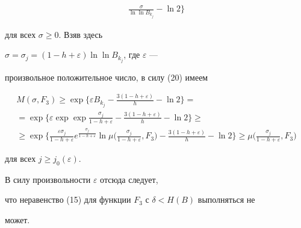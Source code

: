 \begin{pf}
\begin{multline*}
\frac{\sigma}{\ln\ln B_{k_j}}-\ln 2\biggr\} 


\end{multline*} 


для всех $\sigma\ge 0$. Взяв здесь 


$\sigma=\sigma_j=(1-h+\varepsilon)\ln\ln B_{k_j}$, где $\varepsilon$ --- 


произвольное положительное число, в силу (20) имеем 


\begin{multline*} 


M(\sigma,F_3)\ge \exp\biggl\{\varepsilon B_{k_j}- 


\frac{3(1-h+\varepsilon)}{h}-\ln 2\biggr\}=\\ 


=\exp\biggl\{\varepsilon\exp\exp\frac{\sigma_j}{1-h+\varepsilon} 


-\frac{3(1-h+\varepsilon)}{h}-\ln 2\biggr\}\ge\\ 


\ge\exp\biggl\{\frac{\varepsilon\sigma_j}{1-h+\varepsilon} 


e^{\frac{\sigma_j}{1-h+\varepsilon}}\ln\mu 


\biggl(\frac{\sigma_j}{1-h+\varepsilon},F_3 \biggr)- 


\frac{3(1-h+\varepsilon)}{h}-\ln 2\biggr\}\ge 


\mu\biggl(\frac{\sigma_j}{1-h+\varepsilon},F_3 \biggr) 


\end{multline*} 


для всех $j\ge j_0(\varepsilon)$. 


В силу произвольности $\varepsilon$ отсюда следует, 


что неравенство (15) для функции $F_3$ с $\delta<H(B)$ выполняться не 


может. 


\end{pf} 


 


